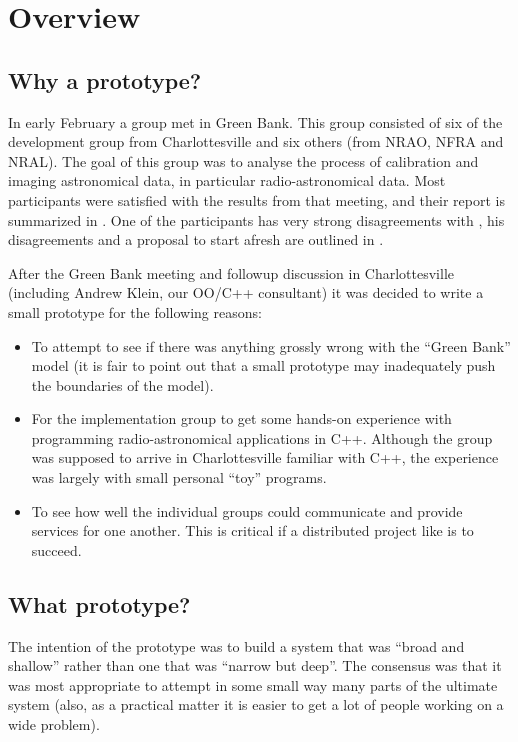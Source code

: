 \chapter{Overview}

\section{Why a prototype?}

In early February a group met in Green Bank. This group consisted of
six of the \aipspp development group from Charlottesville and six
others (from NRAO, NFRA and NRAL). The goal of this group was to
analyse the process of calibration and imaging astronomical data, in
particular radio-astronomical data. Most participants were satisfied
with the results from that meeting, and their report is summarized in
\cite{key1}. One of the participants has very strong disagreements with
\cite{key1}, his disagreements and a proposal to start afresh are outlined
in \cite{key2}.

After the Green Bank meeting and followup discussion in
Charlottesville (including Andrew Klein, our OO/C++ consultant) it was
decided to write a small prototype for the following reasons:
\begin{itemize}
\item
To attempt to see if there was anything grossly wrong with the ``Green
Bank'' model (it is fair to point out that a small prototype may
inadequately push the boundaries of the model).
\item
For the implementation group to get some hands-on experience with
programming radio-astronomical applications in C++. Although the group
was supposed to arrive in Charlottesville familiar with C++, the
experience was largely with small personal ``toy'' programs.
\item
To see how well the individual groups could communicate and provide
services for one another. This is critical if a distributed project
like \aipspp is to succeed.
\end{itemize}

\section{What prototype?}

The intention of the prototype was to build a system that was ``broad
and shallow'' rather than one that was ``narrow but deep''. The
consensus was that it was most appropriate to attempt in some small
way many parts of the ultimate system (also, as a practical matter it
is easier to get a lot of people working on a wide problem).

